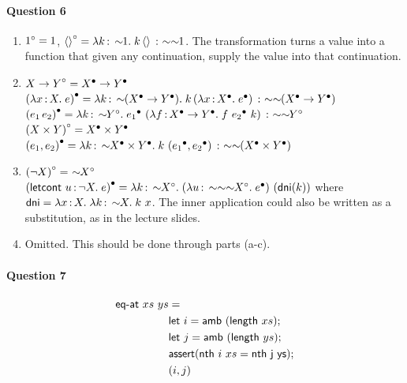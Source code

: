 \documentclass[11pt,a4paper,twoside]{article}
\begin{document}
\paragraph*{Question 6}
\begin{enumerate}[label=(\alph*)]
  \item ${1}^{\circ} = 1$, ${\langle\rangle}^{\circ} = \lambda k \,{:}\, \sim\!\!1 .\; k \, \langle\rangle \,:\ \sim\sim\!\!1$.
    The transformation turns a value into a function that given any continuation,
    supply the value into that continuation.
  \item ${X \to Y}^{\circ} = {X}^{\bullet} \to {Y}^{\bullet}$\\
    $\Tdot{(\lam{x}{X}{e})} = \lam{k}{\qneg(\Tdot{X} \to \Tdot{Y})}{\app{k}{(\lam{x}{\Tdot{X}}{\Tdot{e}})}} \,:\ \sim\qneg{(\Tdot{X} \to \Tdot{Y})}$\\
    $\Tdot{(\app{e_1}{e_2})} = \lam{k}{\qneg{\Tcirc{Y}}}{\Tdot{e_1}\ (\lam{f}{\Tdot{X} \to \Tdot{Y}}{f\ \Tdot{e_2}\ k})} \,:\ \sim\qneg{\Tcirc{Y}}$ \\

    ${(X \times Y)}^{\circ} = {X}^{\bullet} \times {Y}^{\bullet} $\\
    ${(e_1, e_2)}^{\bullet} = \lambda k \,{:}\, \sim\!\!{X}^{\bullet} \times {Y}^{\bullet} .\; k\ ({e_1}^{\bullet}, {e_2}^{\bullet}) \,:\ \sim\sim\!\!({X}^{\bullet} \times {Y}^{\bullet})$
  \item $\Tcirc{(\neg{X})} =\ \qneg{\Tcirc{X}}$ \\
    $\Tdot{(\letcont{u}{\neg X}{e})} = \lam{k}{\qneg{\Tcirc{X}}}{(\lam{u}{\sim\sim\qneg{\Tcirc{X}}}{\Tdot{e}})\ (\mathsf{dni}(k))}$
    where $\mathsf{dni} = \lambda x \,{:}\, X .\; \lambda k \,{:}\, \sim\!\!X .\; k\ x$. The inner application could also be written as a substitution,
    as in the lecture slides.
  \item Omitted. This should be done through parts (a-c).
\end{enumerate}

\paragraph*{Question 7} 
\begin{align*}
  \textsf{eq-at}\ xs\ ys & = \\
  &\mathsf{let}\ i = \mathsf{amb}\ (\mathsf{length}\ xs);\, \\
  &\mathsf{let}\ j = \mathsf{amb}\ (\mathsf{length}\ ys);\, \\
  &\mathsf{assert}(\mathsf{nth}\ i\ xs = \mathsf{nth\ j\ ys}); \\
  &(i, j)
\end{align*}
\end{document}

